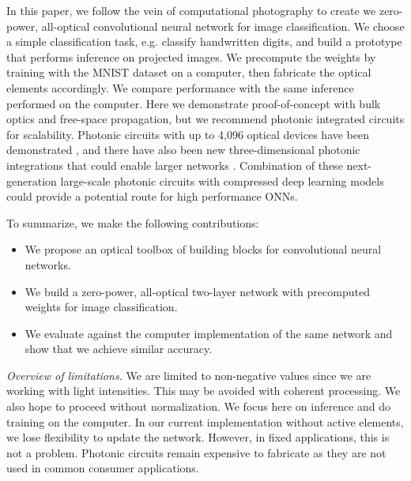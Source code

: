 In this paper, we follow the vein of computational photography to create we zero-power, all-optical convolutional neural network for image classification. We choose a simple classification task, e.g. classify handwritten digits, and build a prototype that performs inference on projected images. We precompute the weights by training with the MNIST dataset on a computer, then fabricate the optical elements accordingly. We compare performance with the same inference performed on the computer. Here we demonstrate proof-of-concept with bulk optics and free-space propagation, but we recommend photonic integrated circuits for scalability. Photonic circuits with up to 4,096 optical devices have been demonstrated \cite{sun2013large}, and there have also been new three-dimensional photonic integrations that could enable larger networks \cite{rechtsman2013photonic}. Combination of these next-generation large-scale photonic circuits with compressed deep learning models could provide a potential route for high performance ONNs.

To summarize, we make the following contributions:
\begin{itemize}
\item We propose an optical toolbox of building blocks for convolutional neural networks. 
\item We build a zero-power, all-optical two-layer network with precomputed weights for image classification. 
\item We evaluate against the computer implementation of the same network and show that we achieve similar accuracy.
\end{itemize}

\textit{Overview of limitations.} We are limited to non-negative values since we are working with light intensities. This may be avoided with coherent processing. We also hope to proceed without normalization. We focus here on inference and do training on the computer. In our current implementation without active elements, we lose flexibility to update the network. However, in fixed applications, this is not a problem. Photonic circuits remain expensive to fabricate as they are not used in common consumer applications.

